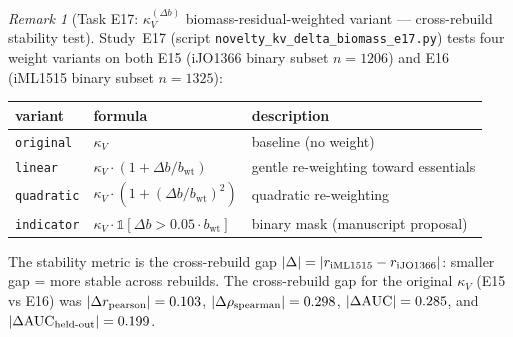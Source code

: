 \documentclass[11pt,a4paper]{article}
\theoremstyle{plain}
\theoremstyle{definition}
\theoremstyle{remark}
\newtheorem{remark}[theorem]{Remark}
\begin{document}
\begin{remark}[Task E17: $\kappa_V^{(\Delta b)}$ biomass-residual-weighted
variant --- cross-rebuild stability test]
\label{rem:e17-delta-biomass-variant}
Study~E17 (script \texttt{novelty\_kv\_delta\_biomass\_e17.py}) tests
four weight variants on both E15 (iJO1366 binary subset $n=1206$)
and E16 (iML1515 binary subset $n=1325$):
\begin{center}
\begin{tabular}{lll}
\hline
variant & formula & description \\
\hline
\texttt{original}   & $\kappa_V$                                                       & baseline (no weight) \\
\texttt{linear}     & $\kappa_V \cdot (1 + \Delta b/b_{\mathrm{wt}})$                  & gentle re-weighting toward essentials \\
\texttt{quadratic}  & $\kappa_V \cdot (1 + (\Delta b/b_{\mathrm{wt}})^2)$              & quadratic re-weighting \\
\texttt{indicator}  & $\kappa_V \cdot \mathbb{1}[\Delta b > 0.05 \cdot b_{\mathrm{wt}}]$ & binary mask (manuscript proposal) \\
\hline
\end{tabular}
\end{center}
The stability metric is the cross-rebuild gap
$|\Delta| = |r_{\textnormal{iML1515}} - r_{\textnormal{iJO1366}}|$:
smaller gap = more stable across rebuilds. The cross-rebuild gap for
the original $\kappa_V$ (E15 vs E16) was $|\Delta r_{\textnormal{pearson}}|
= 0.103$, $|\Delta \rho_{\textnormal{spearman}}| = 0.298$,
$|\Delta \textnormal{AUC}| = 0.285$, and $|\Delta
\textnormal{AUC}_{\textnormal{held-out}}| = 0.199$.


\end{remark}
\end{document}
